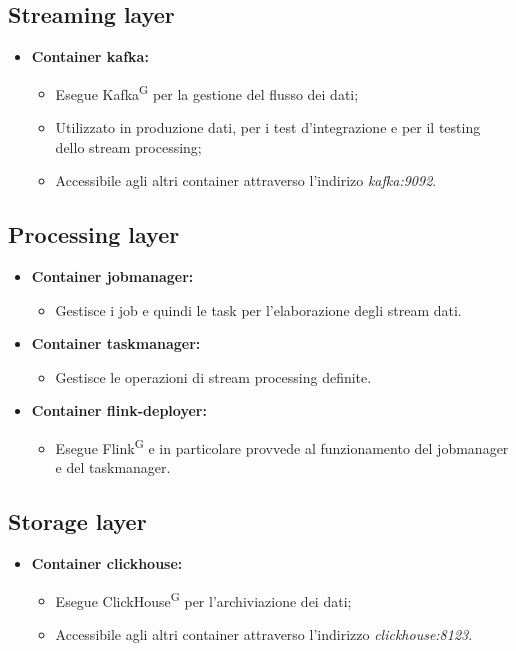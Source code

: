 \documentclass[8pt]{article}
\newcommand{\glossterm}[1]{#1\textsuperscript{G}} %
\begin{document}
\subsection{Streaming layer}
\begin{itemize}
    \item \textbf{Container kafka:}
    \begin{itemize}
        \item Esegue \glossterm{Kafka} per la gestione del flusso dei dati;
        \item Utilizzato in produzione dati, per i test d'integrazione e per il testing dello stream processing;
        \item Accessibile agli altri container attraverso l'indirizo \textit{kafka:9092}.
    \end{itemize}
\end{itemize}
\subsection{Processing layer}
\begin{itemize}
    \item \textbf{Container jobmanager:}
    \begin{itemize}
        \item Gestisce i job e quindi le task per l'elaborazione degli stream dati.
    \end{itemize}
    \item \textbf{Container taskmanager:}
    \begin{itemize}
        \item Gestisce le operazioni di stream processing definite.
    \end{itemize}
    \item \textbf{Container flink-deployer:}
    \begin{itemize}
        \item Esegue \glossterm{Flink} e in particolare provvede al funzionamento del jobmanager e del taskmanager.
    \end{itemize}
\end{itemize}
\subsection{Storage layer}
\begin{itemize}
    \item \textbf{Container clickhouse:}
    \begin{itemize}
        \item Esegue \glossterm{ClickHouse} per l'archiviazione dei dati;
        \item Accessibile agli altri container attraverso l'indirizzo \textit{clickhouse:8123}.
    \end{itemize}
\end{itemize}
\end{document}
